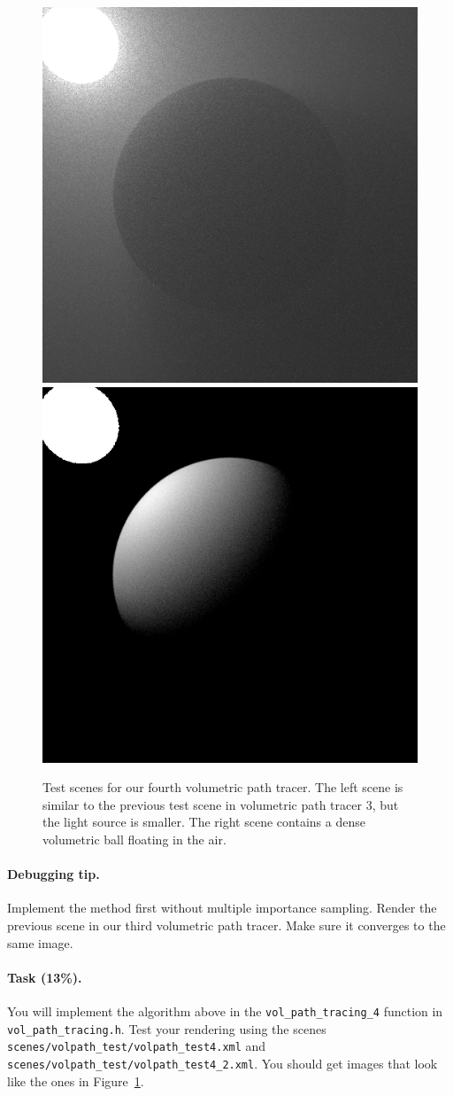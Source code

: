 \begin{figure}
\centering
\includegraphics[width=0.48\linewidth]{imgs/volpath_4.png}
\includegraphics[width=0.48\linewidth]{imgs/volpath_4_2.png}
\caption{Test scenes for our fourth volumetric path tracer. The left scene is similar to the previous test scene in volumetric path tracer 3, but the light source is smaller. The right scene contains a dense volumetric ball floating in the air.}
\label{fig:volpath4}
\end{figure}

\paragraph{Debugging tip.} Implement the method first without multiple importance sampling. Render the previous scene in our third volumetric path tracer. Make sure it converges to the same image.

\paragraph{Task (13\%).} You will implement the algorithm above in the \lstinline{vol_path_tracing_4} function in \lstinline{vol_path_tracing.h}. Test your rendering using the scenes \lstinline{scenes/volpath_test/volpath_test4.xml} and \lstinline{scenes/volpath_test/volpath_test4_2.xml}. You should get images that look like the ones in Figure~\ref{fig:volpath4}.

